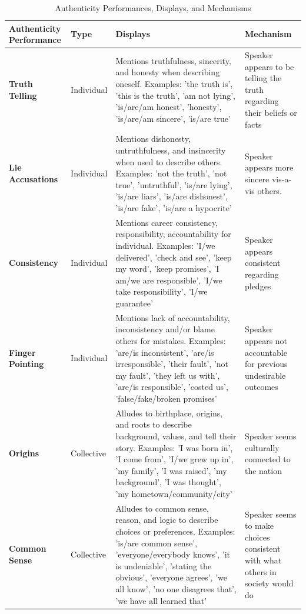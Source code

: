 \documentclass[smallextended]{svjour3}       %
\begin{document}
\begin{landscape}

\begin{table}

\caption{\label{tab:Table 1}Authenticity Performances, Displays, and Mechanisms}
\begin{tabu} to 
\toprule
Authenticity Performance & Type & Displays & Mechanism\\
\midrule
\textbf{Truth Telling} & Individual & Mentions truthfulness, sincerity, and honesty when describing oneself. Examples: 'the truth is', 'this is the truth', 'am not lying', 'is/are/am honest', 'honesty', 'is/are/am sincere', 'is/are true' & Speaker appears to be telling the truth regarding their beliefs or facts\\
\textbf{Lie Accusations} & Individual & Mentions dishonesty, untruthfulness, and insincerity when used to describe others. Examples: 'not the truth', 'not true', 'untruthful', 'is/are lying', 'is/are liars', 'is/are dishonest', 'is/are fake', 'is/are a hypocrite' & Speaker appears more sincere vis-a-vis others.\\
\textbf{Consistency} & Individual & Mentions career consistency, responsibility, accountability for individual. Examples: 'I/we delivered', 'check and see', 'keep my word', 'keep promises', 'I am/we are responsible', 'I/we take responsibility', 'I/we guarantee' & Speaker appears consistent regarding pledges\\
\textbf{Finger Pointing} & Individual & Mentions lack of accountability, inconsistency and/or blame others for mistakes. Examples: 'are/is inconsistent', 'are/is irresponsible', 'their fault', 'not my fault', 'they left us with', 'are/is responsible', 'costed us', 'false/fake/broken promises' & Speaker appears not accountable for previous undesirable outcomes\\
\textbf{Origins} & Collective & Alludes to birthplace, origins, and roots to describe background, values, and tell their story. Examples: 'I was born in', 'I come from', 'I/we grew up in', 'my family', 'I was raised', 'my background', 'I was thought', 'my hometown/community/city' & Speaker seems culturally connected to the nation\\
\addlinespace
\textbf{Common Sense} & Collective & Alludes to common sense, reason, and logic to describe choices or preferences. Examples: 'is/are common sense', 'everyone/everybody knows', 'it is undeniable', 'stating the obvious', 'everyone agrees', 'we all know', 'no one disagrees that', 'we have all learned that' & Speaker seems to make choices consistent with what others in society would do\\

\end{tabu}
\end{table}
\end{landscape}
\end{document}

